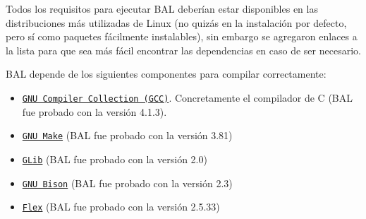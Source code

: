 Todos los requisitos para ejecutar BAL deberían estar disponibles en las distribuciones más utilizadas de Linux (no quizás en la instalación por defecto, pero sí como paquetes fácilmente instalables), sin embargo se agregaron enlaces a la lista para que sea más fácil encontrar las dependencias en caso de ser necesario.

BAL depende de los siguientes componentes para compilar correctamente: \begin{itemize}
\item \href{http://es.wikipedia.org/wiki/GCC}{\tt GNU Compiler Collection (GCC)}. Concretamente el compilador de C (BAL fue probado con la versión 4.1.3). \item \href{http://www.gnu.org/software/make/}{\tt GNU Make} (BAL fue probado con la versión 3.81) \item \href{http://es.wikipedia.org/wiki/GLib}{\tt GLib} (BAL fue probado con la versión 2.0) \item \href{http://es.wikipedia.org/wiki/GNU_Bison}{\tt GNU Bison} (BAL fue probado con la versión 2.3) \item \href{http://en.wikipedia.org/wiki/Flex_lexical_analyser}{\tt Flex} (BAL fue probado con la versión 2.5.33) \end{itemize}


